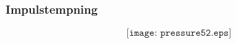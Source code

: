 \documentclass[aspectratio=169,xcolor=dvipsnames]{beamer}
\begin{document}
%
%
%
%
%
%
%
%
%
%
%
%
%
%
\begin{frame}
	\frametitle{Impulstempning}

	$$\texttt{[image: pressure52.eps]}$$
\end{frame}
\end{document}
